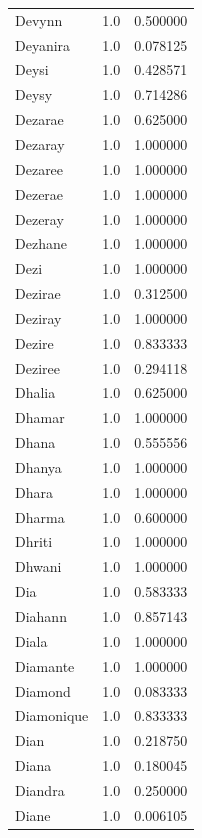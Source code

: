 \documentclass[
  letterpaper,
  DIV=11,
  numbers=noendperiod]{scrreprt}
\begin{document}
\begin{tabular}{lrr}
Devynn          &   1.0 &   0.500000 \\
Deyanira        &   1.0 &   0.078125 \\
Deysi           &   1.0 &   0.428571 \\
Deysy           &   1.0 &   0.714286 \\
Dezarae         &   1.0 &   0.625000 \\
Dezaray         &   1.0 &   1.000000 \\
Dezaree         &   1.0 &   1.000000 \\
Dezerae         &   1.0 &   1.000000 \\
Dezeray         &   1.0 &   1.000000 \\
Dezhane         &   1.0 &   1.000000 \\
Dezi            &   1.0 &   1.000000 \\
Dezirae         &   1.0 &   0.312500 \\
Deziray         &   1.0 &   1.000000 \\
Dezire          &   1.0 &   0.833333 \\
Deziree         &   1.0 &   0.294118 \\
Dhalia          &   1.0 &   0.625000 \\
Dhamar          &   1.0 &   1.000000 \\
Dhana           &   1.0 &   0.555556 \\
Dhanya          &   1.0 &   1.000000 \\
Dhara           &   1.0 &   1.000000 \\
Dharma          &   1.0 &   0.600000 \\
Dhriti          &   1.0 &   1.000000 \\
Dhwani          &   1.0 &   1.000000 \\
Dia             &   1.0 &   0.583333 \\
Diahann         &   1.0 &   0.857143 \\
Diala           &   1.0 &   1.000000 \\
Diamante        &   1.0 &   1.000000 \\
Diamond         &   1.0 &   0.083333 \\
Diamonique      &   1.0 &   0.833333 \\
Dian            &   1.0 &   0.218750 \\
Diana           &   1.0 &   0.180045 \\
Diandra         &   1.0 &   0.250000 \\
Diane           &   1.0 &   0.006105 \\

\end{tabular}
\end{document}
